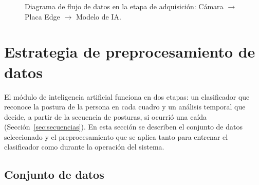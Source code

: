 \documentclass[12pt,a4paper,oneside]{book}
\theoremstyle{plain}
\theoremstyle{definition}
\theoremstyle{remark}
\begin{document}
\begin{figure}[htbp]
\caption{Diagrama de flujo de datos en la etapa de adquisición: Cámara $\rightarrow$ Placa Edge $\rightarrow$ Modelo de IA.}
\label{fig:flujo_adquisicion}
\end{figure}


\section{Estrategia de preprocesamiento de datos}
\label{sec:preprocesamiento}
 
El módulo de inteligencia artificial funciona en dos etapas: un clasificador que reconoce la postura de la persona en cada cuadro y un análisis temporal que decide, a partir de la secuencia de posturas, si ocurrió una caída (Sección~\ref{sec:secuencias}). En esta sección se describen el conjunto de datos seleccionado y el preprocesamiento que se aplica tanto para entrenar el clasificador como durante la operación del sistema.
 
\subsection{Conjunto de datos}
 
\end{document}
